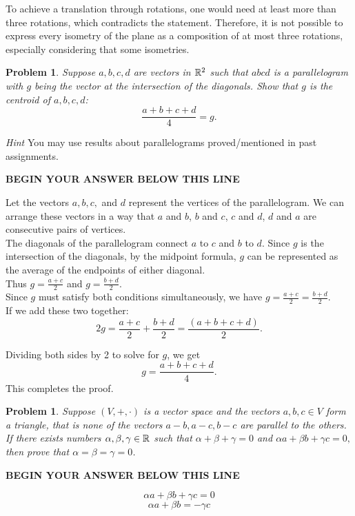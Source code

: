 \documentclass[letter,12pt]{article}
\newtheorem{problem}[main_theorem]{Problem}
\newcommand{\answerspacetop}{
	\begin{center}
		\textbf{BEGIN YOUR ANSWER BELOW THIS LINE} \\ \hrulefill
	\end{center}
}
\begin{document}
To achieve a translation through rotations, one would need at least more than three rotations, which contradicts the statement. Therefore, it is not possible to express every isometry of the plane as a composition of at most three rotations, especially considering that some isometries.
\pagebreak


\begin{problem}  Suppose $a,b,c,d$ are vectors in $\Bbb R^2$ such that $abcd$ is a parallelogram with $g$ being the vector at the intersection of the diagonals. Show that $g$ is the centroid of $a,b,c,d$:
$$\frac{a+b+c+d}{4}=g.$$
\end{problem}
\textit{Hint} You may use results about parallelograms proved/mentioned in past assignments.

\answerspacetop
Let the vectors $a, b, c,$ and $d$ represent the vertices of the parallelogram. We can arrange these vectors in a way that $a$ and $b$, $b$ and $c$, $c$ and $d$, $d$ and $a$ are consecutive pairs of vertices.\\

The diagonals of the parallelogram connect $a$ to $c$ and $b$ to $d$. Since $g$ is the intersection of the diagonals, by the midpoint formula, $g$ can be represented as the average of the endpoints of either diagonal. \\

Thus
$g = \frac{a + c}{2}$ and $g = \frac{b + d}{2}$.\\

Since $g$ must satisfy both conditions simultaneously, we have $g = \frac{a + c}{2} = \frac{b + d}{2}.$\\

If we add these two together:
$$
2g = \frac{a + c}{2} + \frac{b + d}{2} = \frac{(a + b + c + d)}{2}.
$$

Dividing both sides by 2 to solve for $g$, we get
$$
g = \frac{a + b + c + d}{4}.
$$
This completes the proof.
\pagebreak


\begin{problem}  Suppose $(V,+,\cdot)$ is a vector space and the vectors $a,b,c \in V$ form a triangle, that is none of the vectors $a-b,a-c,b-c$ are parallel to the others. If there exists numbers $\alpha,\beta,\gamma \in \Bbb R$ such that $\alpha + \beta + \gamma =0$ and $\alpha a+ \beta b+ \gamma c=0,$ then prove that $\alpha=\beta=\gamma=0$.
\end{problem}

\answerspacetop

$$\alpha a + \beta b + \gamma c = 0$$ 
$$\alpha a + \beta b = -\gamma c$$
\end{document}

